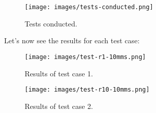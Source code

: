 \documentclass[11pt]{article}
\begin{document}
    \begin{figure}[H]
        \centering
        \texttt{[image: images/tests-conducted.png]}
        \caption{Tests conducted.}
        \label{fig:tests-conducted}
    \end{figure}
    Let's now see the results for each test case:
    \begin{table}[H]
        \centering
        \begin{figure}[H]
            \centering
            \texttt{[image: images/test-r1-10mms.png]}
            \caption{Results of test case 1.}
            \label{fig:test-case-1}
        \end{figure}
    \end{table}
    \begin{table}[H]
        \centering
        \begin{figure}[H]
            \centering
            \texttt{[image: images/test-r10-10mms.png]}
            \caption{Results of test case 2.}
            \label{fig:test-case-2}
        \end{figure}
    \end{table}
\end{document}
